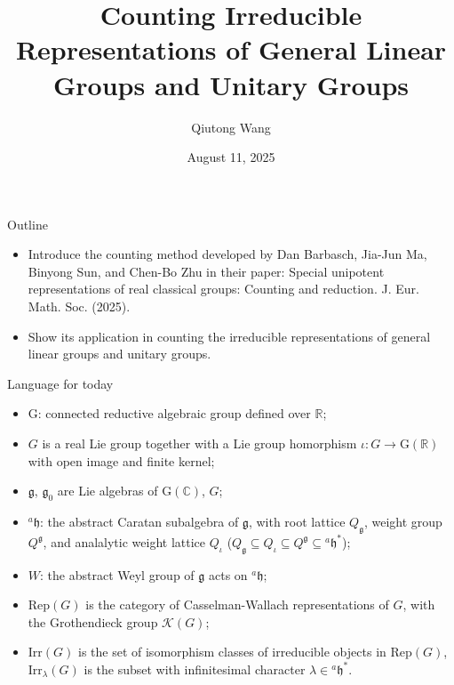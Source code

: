 \documentclass[fleqn,xcolor=dvipsnames]{beamer}
\title[]{Counting Irreducible Representations of General Linear Groups and Unitary Groups}
\author{Qiutong Wang}
\institute{Zhejiang University}
\date{August 11, 2025}
\newcommand{\BC}{{\mathbb {C}}}
\newcommand{\BR}{{\mathbb {R}}}
\newcommand{\CK}{{\mathcal {K}}}
\newcommand{\RG}{{\mathrm {G}}}
\newcommand{\fg}{\mathfrak{g}}
\newcommand{\fh}{\mathfrak{h}}
\newcommand{\Irr}{{\mathrm{Irr}}}
\begin{document}
\begin{frame}
  \titlepage
\end{frame}




\begin{frame}{Outline}

\begin{itemize}
  \item Introduce the counting method developed by Dan Barbasch, Jia-Jun Ma, Binyong Sun, and Chen-Bo Zhu in their paper: Special unipotent representations of real classical groups: Counting and reduction. J. Eur. Math. Soc. (2025). 
  \pause \item Show its application in counting the irreducible representations of general linear groups and unitary groups.
\end{itemize}
\end{frame}












\begin{frame}{Language for today}
  \begin{itemize}
    \item $\RG$: connected reductive algebraic group defined over $\BR$;
    \pause\item $G$ is a real Lie group together with a Lie group homorphism $\iota: G \to \RG(\BR)$ with open image and finite kernel;
    \pause\item $\fg$, $\fg_0$ are Lie algebras of $\RG(\BC)$, $G$;
    \pause\item $^{a}\fh$: the abstract Caratan subalgebra of $\fg$, with root lattice $Q_{\fg}$, weight group $Q^{\fg}$, and analalytic weight lattice $Q_{\iota}$ ($Q_{\fg} \subseteq Q_{\iota} \subseteq Q^{\fg} \subseteq {^{a}\fh}^*$);
    \pause\item $W$: the abstract Weyl group of $\fg$ acts on $^{a}\fh$;
    \pause\item $\mathrm{Rep}(G)$ is the category of Casselman-Wallach representations of $G$, with the Grothendieck group $\CK(G)$;
    \pause\item $\mathrm{Irr}(G)$ is the set of isomorphism classes of irreducible objects in $\mathrm{Rep}(G)$, $\Irr_{\lambda}(G)$ is the subset with infinitesimal character $\lambda \in {^{a}\fh}^*$.
  \end{itemize}
\end{frame}
\end{document}
